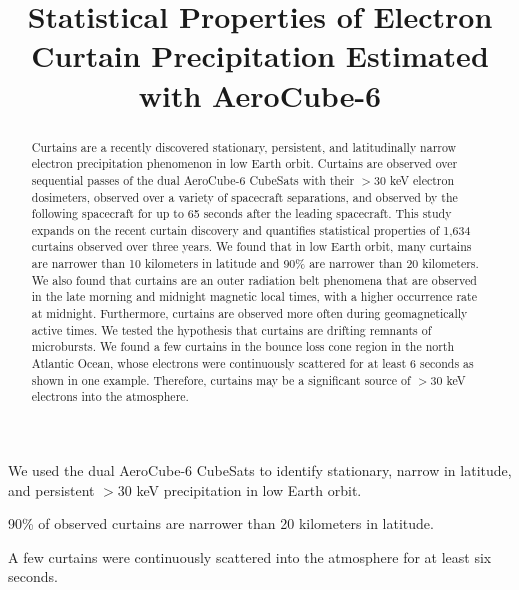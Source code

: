 \documentclass[draft]{agujournal2019}
\begin{document}
\title{Statistical Properties of Electron Curtain Precipitation Estimated with AeroCube-6}

%
%






\begin{keypoints}
\item We used the dual AeroCube-6 CubeSats to identify stationary, narrow in latitude, and persistent $>30$ keV precipitation in low Earth orbit.
\item 90\% of observed curtains are narrower than 20 kilometers in latitude.
\item A few curtains were continuously scattered into the atmosphere for at least six seconds.
\end{keypoints}


\begin{abstract}
Curtains are a recently discovered stationary, persistent, and latitudinally narrow electron precipitation phenomenon in low Earth orbit. Curtains are observed over sequential passes of the dual AeroCube-6 CubeSats with their $> 30$ keV electron dosimeters, observed over a variety of spacecraft separations, and observed by the following spacecraft for up to 65 seconds after the leading spacecraft. This study expands on the recent curtain discovery and quantifies statistical properties of 1,634 curtains observed over three years. We found that in low Earth orbit, many curtains are narrower than 10 kilometers in latitude and 90\% are narrower than 20 kilometers. We also found that curtains are an outer radiation belt phenomena that are observed in the late morning and midnight magnetic local times, with a higher occurrence rate at midnight. Furthermore, curtains are observed more often during geomagnetically active times. We tested the hypothesis that curtains are drifting remnants of microbursts. We found a few curtains in the bounce loss cone region in the north Atlantic Ocean, whose electrons were continuously scattered for at least 6 seconds as shown in one example. Therefore, curtains may be a significant source of $> 30$ keV electrons into the atmosphere.
\end{abstract}
\end{document}
